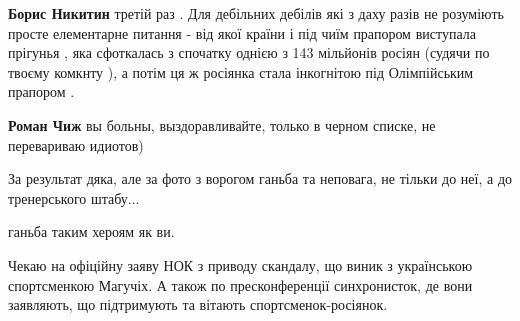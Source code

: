 \begin{itemize}
\begin{itemize}
\begin{itemize}
\textbf{Борис Никитин} третій раз . Для дебільних дебілів які з даху разів не
розуміють просте елементарне питання - від якої країни і під чиїм прапором
виступала прігунья , яка сфоткалась з спочатку однією з 143 мільйонів росіян
(судячи по твоєму комкнту ), а потім ця ж росіянка стала інкогнітою під
Олімпійським прапором .

 
\textbf{Роман Чиж} вы больны, выздоравливайте, только в черном списке, не перевариваю идиотов)

\end{itemize}

\end{itemize}

 
За результат дяка, але за фото з ворогом ганьба та неповага, не тільки до неї, а до тренерського штабу...

\begin{itemize}
 
ганьба таким хероям як ви.
\end{itemize}

 

Чекаю на офіційну заяву НОК з приводу скандалу, що виник з українською
спортсменкою Магучіх. А також по пресконференції синхронисток, де вони
заявляють, що підтримують та вітають спортсменок-росіянок.

\begin{itemize}
 

\end{itemize}
\end{itemize}

